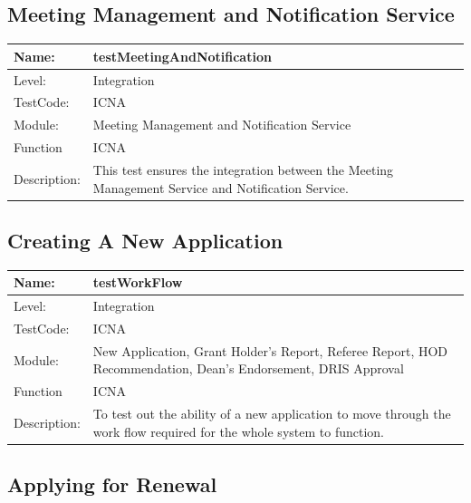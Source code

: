 \documentclass[12pt]{article}
\begin{document}
\begin{flushleft}
\subsection{Meeting Management and Notification Service}
\begin{center}
\begin{tabular}{|l|p{12cm}|}
\hline
 Name: & testMeetingAndNotification  \\
\hline
Level: & Integration \\
\hline
TestCode: & ICNA \\
\hline
Module:& Meeting Management and Notification Service \\
\hline
Function & ICNA \\
\hline
Description: & This test ensures the integration between the Meeting Management Service and Notification Service. \\
\hline
\end{tabular}
\end{center}

\subsection{Creating A New Application}
\begin{center}
\begin{tabular}{|l|p{12cm}|}
\hline
 Name: & testWorkFlow  \\
\hline
Level: & Integration \\
\hline
TestCode: & ICNA \\
\hline
Module:& New Application, Grant Holder's Report, Referee Report, HOD Recommendation, Dean's Endorsement, DRIS Approval \\
\hline
Function & ICNA \\
\hline
Description: & To test out the ability of a new application to move through the work flow required for the whole system to function. \\
\hline
\end{tabular}
\end{center}

\subsection{Applying for Renewal}


\end{flushleft}
\end{document}

